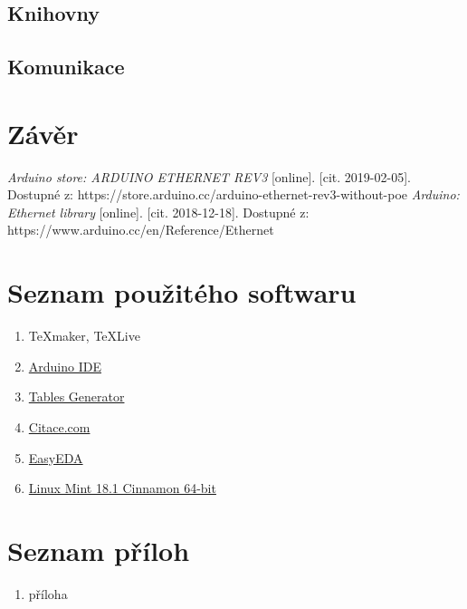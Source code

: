 \documentclass[a4paper,12pt, twoside]{article} %
\begin{document}
\subsection{Knihovny}
\label{sec:knihovny}
%
\subsection{Komunikace}
\label{sec:komunikace_server_client}
\clearpage
\section{Závěr}
%
\clearpage
\renewcommand{\refname}{Seznam použité literatury a zdrojů informací}
\begin{thebibliography}{99}
\textit{Arduino store: ARDUINO ETHERNET REV3} [online]. [cit. 2019-02-05]. Dostupné z: https://store.arduino.cc/arduino-ethernet-rev3-without-poe
\textit{Arduino: Ethernet library} [online]. [cit. 2018-12-18]. Dostupné z: https://www.arduino.cc/en/Reference/Ethernet
\end{thebibliography}
\clearpage
{} %
\section*{Seznam použitého softwaru}
\begin{enumerate}%
	\item \TeX maker, \TeX Live
	\item \href{https://www.arduino.cc/en/main/software}{Arduino IDE}
	\item \href{https://www.tablesgenerator.com/latex_tables}{Tables Generator}
	\item \href{https://www.citace.com/citace-pro}{Citace.com}
	\item \href{https://easyeda.com/}{EasyEDA}
	\item \href{https://linuxmint.com/}{Linux Mint 18.1 Cinnamon 64-bit}
\end{enumerate}
\section*{Seznam příloh} 
\begin{enumerate}[{Příloha} 1:]
\item příloha
\end{enumerate}
\end{document}
